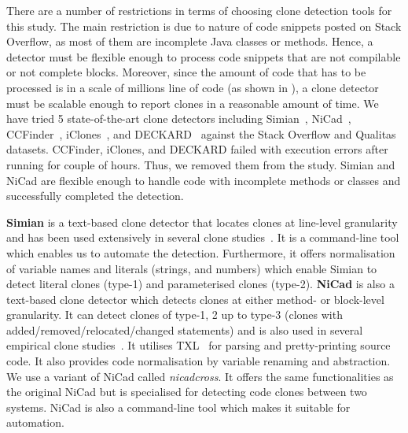 \documentclass[sigconf,review, anonymous]{acmart}
\begin{document}
There are a number of restrictions in terms of choosing clone
detection tools for this study. The main restriction is due to nature
of code snippets posted on Stack Overflow, as most of them are
incomplete Java classes or methods. Hence, a detector must be flexible
enough to process code snippets that are not compilable or not
complete blocks. Moreover, since the amount of code that has to be
processed is in a scale of millions line of code (as shown in
), a clone detector must be scalable enough to
report clones in a reasonable amount of time. We have tried 5
state-of-the-art clone detectors including Simian~\cite{simian},
NiCad~\cite{Cordy,Roy2008}, CCFinder~\cite{Kamiya2002},
iClones~\cite{Gode2009}, and DECKARD~\cite{Jiang2007a} against the
Stack Overflow and Qualitas datasets. CCFinder, iClones, and DECKARD
failed with execution errors after running for couple of hours. Thus,
we removed them from the study. Simian and NiCad are flexible enough
to handle code with incomplete methods or classes and successfully
completed the detection.

\textbf{Simian} is a text-based clone detector that locates clones at line-level granularity and has been used extensively in several clone studies~\cite{Ragkhitwetsagul2016, Wang2013, Mondal2011, Cheung2015, Krinke2010}. It is a command-line tool which enables us to automate the detection. Furthermore, it offers normalisation of variable names and literals (strings, and numbers) which enable Simian to detect literal clones (type-1) and parameterised clones (type-2). \textbf{NiCad} is also a text-based clone detector which detects clones at either method- or block-level granularity. It can detect clones of type-1, 2 up to type-3 (clones with added/removed/relocated/changed statements) and is also used in several empirical clone studies~\cite{Roy2008, Ragkhitwetsagul2016, Svajlenko2014, Wang2013, Mondal2011, Sajnani2016}. It utilises TXL~\cite{Cordy2006} for parsing and pretty-printing source code. It also provides code normalisation by variable renaming and abstraction. We use a variant of NiCad called \textit{nicadcross}. It offers the same functionalities as the original NiCad but is specialised for detecting code clones between two systems. NiCad is also a command-line tool which makes it suitable for automation.
\end{document}
